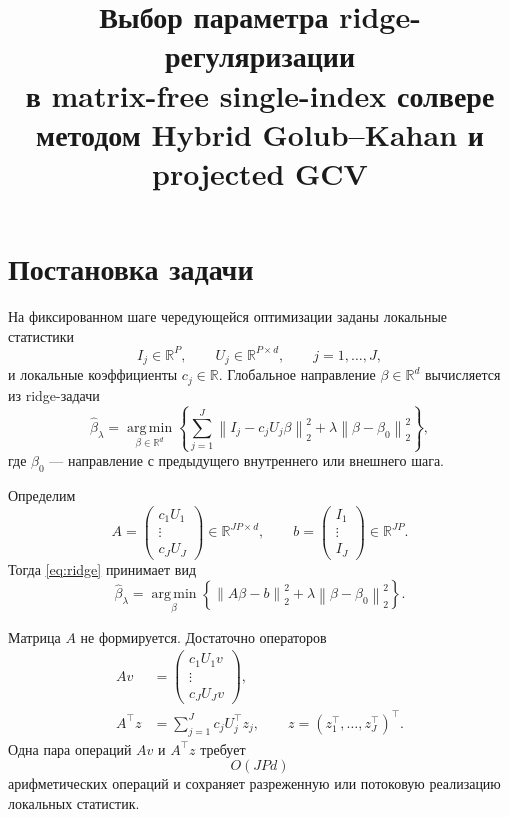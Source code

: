 \documentclass[11pt,a4paper]{article}
\title{Выбор параметра ridge-регуляризации\\
в matrix-free single-index солвере\\
методом Hybrid Golub--Kahan и projected GCV}
\author{}
\date{}
\newcommand{\R}{\mathbb{R}}
\newcommand{\norm}[1]{\left\lVert #1\right\rVert_2}
\newcommand{\argmin}{\operatorname*{arg\,min}}
\begin{document}
\maketitle

\section{Постановка задачи}

На фиксированном шаге чередующейся оптимизации заданы локальные статистики
\[
    I_j\in\R^{P},
    \qquad
    U_j\in\R^{P\times d},
    \qquad
    j=1,\ldots,J,
\]
и локальные коэффициенты \(c_j\in\R\).
Глобальное направление \(\beta\in\R^d\) вычисляется из ridge-задачи
\begin{equation}
\label{eq:ridge}
    \widehat\beta_\lambda
    =
    \argmin_{\beta\in\R^d}
    \left\{
        \sum_{j=1}^{J}
        \norm{I_j-c_jU_j\beta}^{2}
        +
        \lambda\norm{\beta-\beta_0}^{2}
    \right\},
\end{equation}
где \(\beta_0\) --- направление с предыдущего внутреннего или внешнего шага.

Определим
\[
    A=
    \begin{pmatrix}
        c_1U_1\\
        \vdots\\
        c_JU_J
    \end{pmatrix}
    \in\R^{JP\times d},
    \qquad
    b=
    \begin{pmatrix}
        I_1\\
        \vdots\\
        I_J
    \end{pmatrix}
    \in\R^{JP}.
\]
Тогда \eqref{eq:ridge} принимает вид
\begin{equation}
\label{eq:ridge-compact}
    \widehat\beta_\lambda
    =
    \argmin_{\beta}
    \left\{
        \norm{A\beta-b}^{2}
        +
        \lambda\norm{\beta-\beta_0}^{2}
    \right\}.
\end{equation}

Матрица \(A\) не формируется. Достаточно операторов
\begin{align}
\label{eq:matvec}
    Av
    &=
    \begin{pmatrix}
        c_1U_1v\\
        \vdots\\
        c_JU_Jv
    \end{pmatrix},
    \\
\label{eq:rmatvec}
    A^\top z
    &=
    \sum_{j=1}^{J}
    c_jU_j^\top z_j,
    \qquad
    z=
    (z_1^\top,\ldots,z_J^\top)^\top .
\end{align}
Одна пара операций \(Av\) и \(A^\top z\) требует
\[
    O(JPd)
\]
арифметических операций и сохраняет разреженную или потоковую реализацию локальных статистик.
\end{document}
